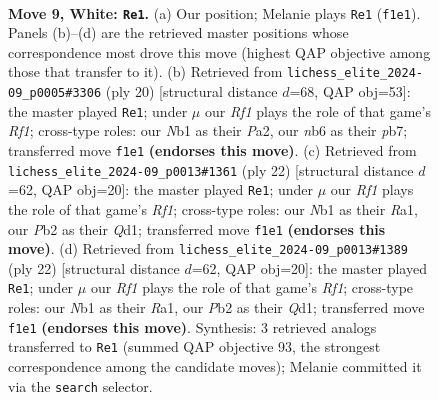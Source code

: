 \documentclass[11pt]{article}
\begin{document}
\clearpage

\begin{figure}[p]\centering
\begin{subfigure}{0.46\textwidth}\centering
\resizebox{\linewidth}{!}{%
\newchessgame
\chessboard[
  setfen={rnbqk2r/pp3pbp/1n1pp1p1/8/3P4/1B3N2/PPP2PPP/RNBQ1RK1 w kq - 0 9},
  showmover=false,
  pgfstyle=straightmove, color=movearrow, markmove={f1-e1}
]}
\caption{}
\end{subfigure}\hfill
\begin{subfigure}{0.46\textwidth}\centering
\resizebox{\linewidth}{!}{%
\newchessgame
\chessboard[
  setfen={r1bq1rk1/pp1nppbp/6p1/3p4/3P1B2/3B1N2/PPP2PPP/R2Q1RK1 w - - 4 11},
  showmover=false,
  pgfstyle=straightmove, color=movearrow, markmove={f1-e1}
]}
\caption{}
\end{subfigure}
\\[4pt]
\begin{subfigure}{0.46\textwidth}\centering
\resizebox{\linewidth}{!}{%
\newchessgame
\chessboard[
  setfen={r1bq1rk1/p4pp1/2pb1n1p/n3p3/8/2NB1N2/PPPP1PPP/R1BQ1RK1 w - - 2 12},
  showmover=false,
  pgfstyle=straightmove, color=movearrow, markmove={f1-e1}
]}
\caption{}
\end{subfigure}\hfill
\begin{subfigure}{0.46\textwidth}\centering
\resizebox{\linewidth}{!}{%
\newchessgame
\chessboard[
  setfen={r1bq1rk1/p4pp1/2pb1n1p/n3p3/8/2NB1N2/PPPP1PPP/R1BQ1RK1 w - - 2 12},
  showmover=false,
  pgfstyle=straightmove, color=movearrow, markmove={f1-e1}
]}
\caption{}
\end{subfigure}
\caption{\textbf{Move 9, White: \texttt{Re1}.} (a) Our position; Melanie plays \texttt{Re1} (\texttt{f1e1}). Panels (b)--(d) are the retrieved master positions whose correspondence most drove this move (highest QAP objective among those that transfer to it). (b) Retrieved from \texttt{lichess\_elite\_2024-09\_p0005\#3306} (ply 20) [structural distance $d$=68, QAP obj=53]: the master played \texttt{Re1}; under $\mu$ our \emph{Rf1} plays the role of that game's \emph{Rf1}; cross-type roles: our \emph{N}b1 as their \emph{P}a2, our \emph{n}b6 as their \emph{p}b7; transferred move \texttt{f1e1} \textbf{(endorses this move)}. (c) Retrieved from \texttt{lichess\_elite\_2024-09\_p0013\#1361} (ply 22) [structural distance $d$=62, QAP obj=20]: the master played \texttt{Re1}; under $\mu$ our \emph{Rf1} plays the role of that game's \emph{Rf1}; cross-type roles: our \emph{N}b1 as their \emph{R}a1, our \emph{P}b2 as their \emph{Q}d1; transferred move \texttt{f1e1} \textbf{(endorses this move)}. (d) Retrieved from \texttt{lichess\_elite\_2024-09\_p0013\#1389} (ply 22) [structural distance $d$=62, QAP obj=20]: the master played \texttt{Re1}; under $\mu$ our \emph{Rf1} plays the role of that game's \emph{Rf1}; cross-type roles: our \emph{N}b1 as their \emph{R}a1, our \emph{P}b2 as their \emph{Q}d1; transferred move \texttt{f1e1} \textbf{(endorses this move)}. Synthesis: 3 retrieved analogs transferred to \texttt{Re1} (summed QAP objective 93, the strongest correspondence among the candidate moves); Melanie committed it via the \texttt{search} selector.}
\label{fig:thought-m16}
\end{figure}
\end{document}
